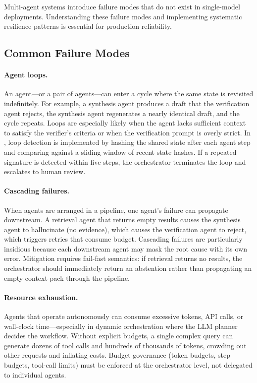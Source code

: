 Multi-agent systems introduce failure modes that do not exist in single-model deployments. Understanding these failure modes and implementing systematic resilience patterns is essential for production reliability.

\subsection{Common Failure Modes}

\paragraph{Agent loops.}
An agent---or a pair of agents---can enter a cycle where the same state is revisited indefinitely. For example, a synthesis agent produces a draft that the verification agent rejects, the synthesis agent regenerates a nearly identical draft, and the cycle repeats. Loops are especially likely when the agent lacks sufficient context to satisfy the verifier's criteria or when the verification prompt is overly strict. In \ishtar{}, loop detection is implemented by hashing the shared state after each agent step and comparing against a sliding window of recent state hashes. If a repeated signature is detected within five steps, the orchestrator terminates the loop and escalates to human review.

\paragraph{Cascading failures.}
When agents are arranged in a pipeline, one agent's failure can propagate downstream. A retrieval agent that returns empty results causes the synthesis agent to hallucinate (no evidence), which causes the verification agent to reject, which triggers retries that consume budget. Cascading failures are particularly insidious because each downstream agent may mask the root cause with its own error. Mitigation requires fail-fast semantics: if retrieval returns no results, the orchestrator should immediately return an abstention rather than propagating an empty context pack through the pipeline.

\paragraph{Resource exhaustion.}
Agents that operate autonomously can consume excessive tokens, API calls, or wall-clock time---especially in dynamic orchestration where the LLM planner decides the workflow. Without explicit budgets, a single complex query can generate dozens of tool calls and hundreds of thousands of tokens, crowding out other requests and inflating costs. Budget governance (token budgets, step budgets, tool-call limits) must be enforced at the orchestrator level, not delegated to individual agents.


